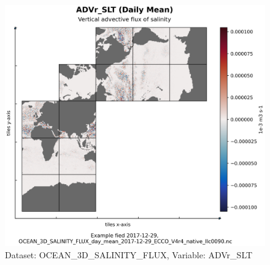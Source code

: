 \begin{longtable}{|m{}|m{}|m{}|m{}|}
\end{longtable}

\begin{figure}[H]
\centering
\includegraphics[scale=0.55]{../images/plots/native_plots/Ocean_Three-Dimensional_Salinity_Fluxes/ADVr_SLT.png}
\caption{Dataset: OCEAN\_3D\_SALINITY\_FLUX, Variable: ADVr\_SLT}
\label{tab:table-OCEAN_3D_SALINITY_FLUX_ADVr_SLT-Plot}
\end{figure}
\pagebreak
